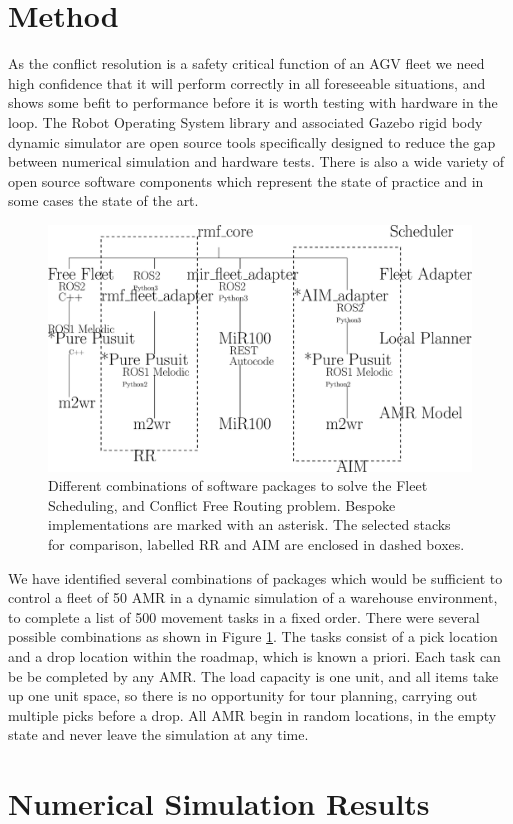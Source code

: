 \documentclass[runningheads]{llncs}
\begin{document}
\section{Method}
As the conflict resolution is a safety critical function of an AGV fleet we need high confidence that it will perform correctly in all foreseeable situations, and shows some befit to performance before it is worth testing with hardware in the loop. The Robot Operating System library and associated Gazebo rigid body dynamic simulator are open source tools specifically designed to reduce the gap between numerical simulation and hardware tests. There is also a wide variety of open source software components which represent the state of practice and in some cases the state of the art. 
\begin{figure}[htbp]
\centerline{\includegraphics[width=0.7\linewidth]{ros2_fleet_options.eps}}
\caption{Different combinations of software packages to solve the Fleet Scheduling, and Conflict Free Routing problem. Bespoke implementations are marked with an asterisk. The selected stacks for comparison, labelled RR and AIM are enclosed in dashed boxes.}
\label{fig:ros2_fleet_options}
\end{figure}
We have identified several combinations of packages which would be sufficient to control a fleet of 50 AMR in a dynamic simulation of a warehouse environment, to complete a list of 500 movement tasks in a fixed order. There were several possible combinations as shown in Figure \ref{fig:ros2_fleet_options}. The tasks consist of a pick location and a drop location within the roadmap, which is known a priori. Each task can be be completed by any AMR. The load capacity is one unit, and all items take up one unit space, so there is no opportunity for tour planning, carrying out multiple picks before a drop. All AMR begin in random locations, in the empty state and never leave the simulation at any time.  

  
\section{Numerical Simulation Results}
\end{document}
